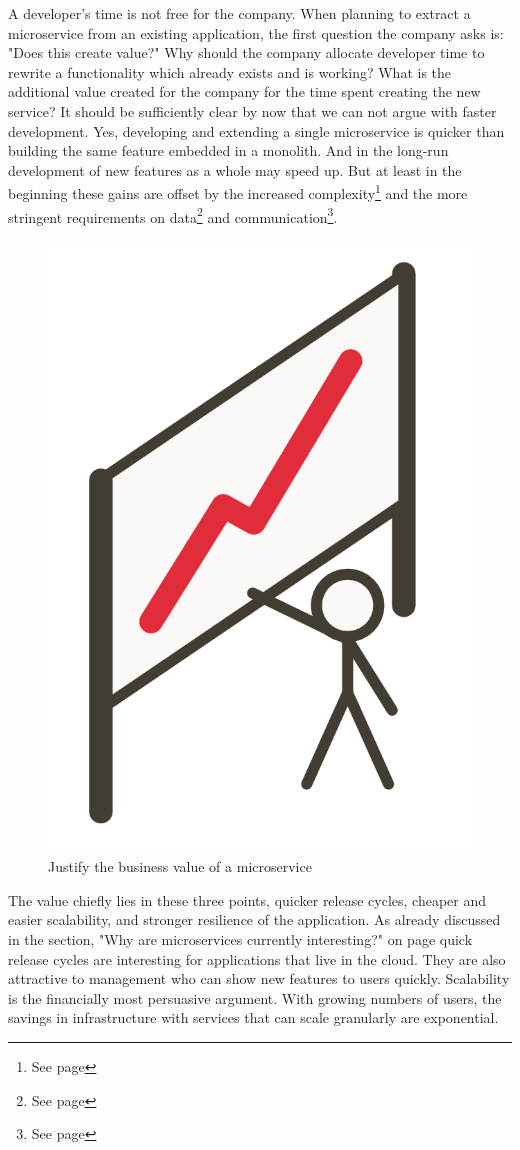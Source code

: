 A developer's time is not free for the company. When planning to extract a microservice from an existing application, the first question the company asks is: "Does this create value?" Why should the company allocate developer time to rewrite a functionality which already exists and is working? What is the additional value created for the company for the time spent creating the new service? It should be sufficiently clear by now that we can not argue with faster development. Yes, developing and extending a single microservice is quicker than building the same feature embedded in a monolith. And in the long-run development of new features as a whole may speed up. But at least in the beginning these gains are offset by the increased complexity\footnote{See page \pageref{sec:theory:challenges:ops}} and the more stringent requirements on data\footnote{See page \pageref{sec:theory:challenges:data}} and communication\footnote{See page \pageref{sec:theory:challenges:communication}}.

\begin{figure}[ht]
  \centering
  \includegraphics[width=0.3\linewidth]{assets/illustration-business-values.png}
  \caption{Justify the business value of a microservice}
\end{figure}

The value chiefly lies in these three points, quicker release cycles, cheaper and easier scalability, and stronger resilience of the application. As already discussed in the section, "Why are microservices currently interesting?" on page \pageref{sec:theory:interesting} quick release cycles are interesting for applications that live in the cloud. They are also attractive to management who can show new features to users quickly. Scalability is the financially most persuasive argument. With growing numbers of users, the savings in infrastructure with services that can scale granularly are exponential.

